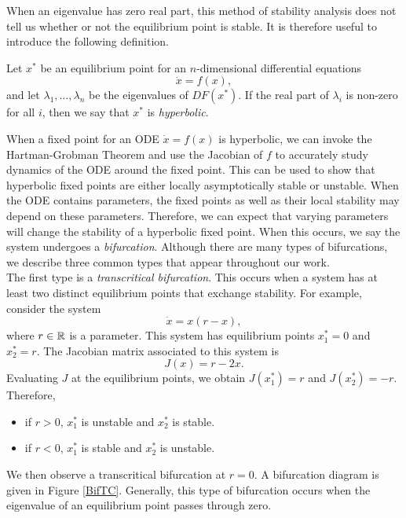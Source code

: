 \documentclass[12pt]{UOthesis}
\theoremstyle{remarkstyle}
\begin{document}
When an eigenvalue has zero real part, this method of stability analysis does not tell us whether or not the equilibrium point is stable. It is therefore useful to introduce the following definition.

\begin{defn}
	Let $x^*$ be an equilibrium point for an $n$-dimensional differential equations $$\dot{x}=f(x),$$
	and let $\lambda_1,\ldots,\lambda_n$ be the eigenvalues of $DF(x^*)$. If the real part of $\lambda_i$ is non-zero for all $i$, then we say that $x^*$ is \emph{hyperbolic}.
	\label{DefHypFP}
\end{defn}

When a fixed point for an ODE $\dot{x}=f(x)$ is hyperbolic, we can invoke the Hartman-Grobman Theorem \cite{Chicone} and use the Jacobian of $f$ to accurately study dynamics of the ODE around the fixed point. This can be used to show that hyperbolic fixed points are either locally asymptotically stable or unstable. When the ODE contains parameters, the fixed points as well as their local stability may depend on these parameters. Therefore, we can expect that varying parameters will change the stability of a hyperbolic fixed point. When this occurs, we say the system undergoes a \textit{bifurcation}. Although there are many types of bifurcations, we describe three common types that appear throughout our work.\\

The first type is a \textit{transcritical bifurcation}. This occurs when a system has at least two distinct equilibrium points that exchange stability. For example, consider the system
\begin{equation}
	\dot{x}=x(r-x),
	\label{TCBifSys}
\end{equation}
where $r\in\mathbb R$ is a parameter. This system has equilibrium points $x^*_1=0$ and $x^*_2=r$. The Jacobian matrix associated to this system is
$$J(x)=r-2x.$$
Evaluating $J$ at the equilibrium points, we obtain $J(x^*_1)=r$ and $J(x^*_2)=-r$. Therefore,
\begin{itemize}
	\item if $r>0$, $x^*_1$ is unstable and $x^*_2$ is stable.
	\item if $r<0$, $x^*_1$ is stable and $x^*_2$ is unstable.
\end{itemize}
We then observe a transcritical bifurcation at $r=0$. A bifurcation diagram is given in Figure \ref{BifTC}. Generally, this type of bifurcation occurs when the eigenvalue of an equilibrium point passes through zero.\\
\end{document}
